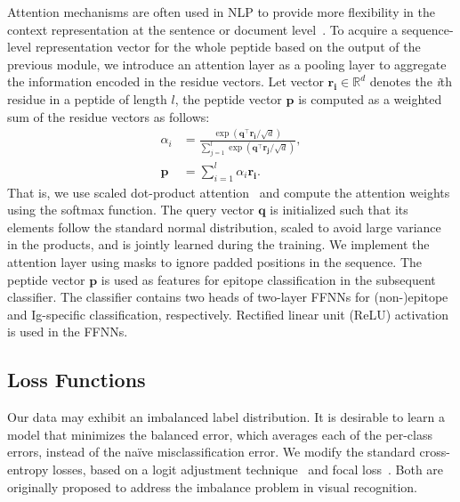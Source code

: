 \documentclass[runningheads]{llncs}
\begin{document}
Attention mechanisms are often used in NLP to provide more flexibility in the context representation at the sentence or document level~\cite{yang2016hierarchical}. To acquire a sequence-level representation vector for the whole peptide based on the output of the previous module, we introduce an attention layer as a pooling layer to aggregate the information encoded in the residue vectors. Let vector $\mathbf{r_i}\in \mathbb{R}^{d}$ denotes the \textit{i}th residue in a peptide of length $l$, the peptide vector $\mathbf{p}$ is computed as a weighted sum of the residue vectors as follows:
\begin{align}
\alpha_i&=\frac{\exp(\mathbf{q}^\top\mathbf{r_i}/\sqrt{d})}{\sum_{j=1}^{l}\exp(\mathbf{q}^\top\mathbf{r_j}/\sqrt{d})}, \\
\mathbf{p}&=\sum_{i=1}^{l}\alpha_i\mathbf{r_i}.
\end{align}
That is, we use scaled dot-product attention~\cite{vaswani2017attention} and compute the attention weights using the softmax function. The query vector $\mathbf{q}$ is initialized such that its elements follow the standard normal distribution, scaled to avoid large variance in the products, and is jointly learned during the training. We implement the attention layer using masks to ignore padded positions in the sequence. The peptide vector $\mathbf{p}$ is used as features for epitope classification in the subsequent classifier. The classifier contains two heads of two-layer FFNNs for (non-)epitope and Ig-specific classification, respectively. Rectified linear unit (ReLU) activation~\cite{glorot2011deep} is used in the FFNNs.

\subsection{Loss Functions}
Our data may exhibit an imbalanced label distribution. It is desirable to learn a model that minimizes the balanced error, which averages each of the per-class errors, instead of the naïve misclassification error. We modify the standard cross-entropy losses, based on a logit adjustment technique~\cite{menon2020long} and focal loss~\cite{lin2017focal}. Both are originally proposed to address the imbalance problem in visual recognition.
\end{document}
